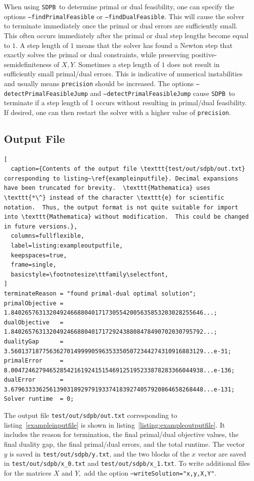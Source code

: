 \documentclass[12pt]{article}
\numberwithin{equation}{section}
\newcommand\SDPB{\texttt{SDPB}}
\begin{document}
When using \SDPB\ to determine primal or dual feasibility, one can specify the options \texttt{--findPrimalFeasible} or \texttt{--findDualFeasible}.  This will cause the solver to terminate immediately once the primal or dual errors are sufficiently small.  This often occurs immediately after the primal or dual step lengths become equal to $1$.  A step length of $1$ means that the solver has found a Newton step that exactly solves the primal or dual constraints, while preserving positive-semidefiniteness of $X,Y$.  Sometimes a step length of $1$ does not result in sufficiently small primal/dual errors.  This is indicative of numerical instabilities and usually means \texttt{precision} should be increased.  The options \texttt{--detectPrimalFeasibleJump} and \texttt{--detectPrimalFeasibleJump} cause \SDPB\ to terminate if a step length of 1 occurs without resulting in primal/dual feasibility.  If desired, one can then restart the solver with a higher value of \texttt{precision}.


\subsection{Output File}

\begin{lstlisting}[
  caption={Contents of the output file \texttt{test/out/sdpb/out.txt} corresponding to listing~\ref{exampleinputfile}. Decimal expansions have been truncated for brevity.  \texttt{Mathematica} uses \texttt{*\^} instead of the character \texttt{e} for scientific notation.  Thus, the output format is not quite suitable for import into \texttt{Mathematica} without modification.  This could be changed in future versions.},
  columns=fullflexible,
  label=listing:exampleoutputfile,
  keepspaces=true,
  frame=single,
  basicstyle=\footnotesize\ttfamily\selectfont,
]
terminateReason = "found primal-dual optimal solution";
primalObjective = 1.8402657631320492466880401717305542005635853203028255646...;
dualObjective   = 1.8402657631320492466880401717292438808478490702030795792...;
dualityGap      = 3.5601371877563627014999905963533505072344274310916883129...e-31;
primalError     = 8.0047246279465285421619241515469125195233878283366044938...e-136;
dualError       = 3.6796333362561390318929791933741839274057920864658268448...e-131;
Solver runtime  = 0;
\end{lstlisting}


The output file \texttt{test/out/sdpb/out.txt} corresponding to
listing~\ref{exampleinputfile} is shown in
listing~\ref{listing:exampleoutputfile}. It includes the reason for
termination, the final primal/dual objective values, the final duality
gap, the final primal/dual errors, and the total runtime. The vector
$y$ is saved in \texttt{test/out/sdpb/y.txt}, and the two blocks of the $x$ vector
are saved in \texttt{test/out/sdpb/x\_0.txt} and
\texttt{test/out/sdpb/x\_1.txt}.  To write additional files for the matrices $X$ and $Y,$ add the
option \newline
\texttt{--writeSolution="x,y,X,Y"}.
\end{document}
